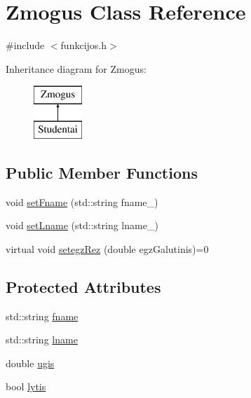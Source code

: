 \hypertarget{class_zmogus}{}\section{Zmogus Class Reference}
\label{class_zmogus}


{\ttfamily \#include $<$funkcijos.\+h$>$}

Inheritance diagram for Zmogus\+:\begin{figure}[H]
\begin{center}
\leavevmode
\includegraphics[height=2.000000cm]{class_zmogus}
\end{center}
\end{figure}
\subsection*{Public Member Functions}
\begin{DoxyCompactItemize}
\item 
void \mbox{\hyperlink{class_zmogus_a77d6cca8a626da110584613d1f260b5e}{set\+Fname}} (std\+::string fname\+\_\+)
\item 
void \mbox{\hyperlink{class_zmogus_af6a47ecc1e25e1b3e78370ad868d52c8}{set\+Lname}} (std\+::string lname\+\_\+)
\item 
virtual void \mbox{\hyperlink{class_zmogus_a19656beb88d5e73a65ceef8c68e191c4}{setegz\+Rez}} (double egz\+Galutinis)=0
\end{DoxyCompactItemize}
\subsection*{Protected Attributes}
\begin{DoxyCompactItemize}
\item 
std\+::string \mbox{\hyperlink{class_zmogus_af32f2351f1bfac2dae5f1fd4ff493a83}{fname}}
\item 
std\+::string \mbox{\hyperlink{class_zmogus_ace05f2507ccb382d614b73f37b933a61}{lname}}
\item 
double \mbox{\hyperlink{class_zmogus_a4eb993c2f44180ab49869ac0b23827b5}{ugis}}
\item 
bool \mbox{\hyperlink{class_zmogus_a853560cbd25814bd3c0a29be8ac19c66}{lytis}}
\end{DoxyCompactItemize}


